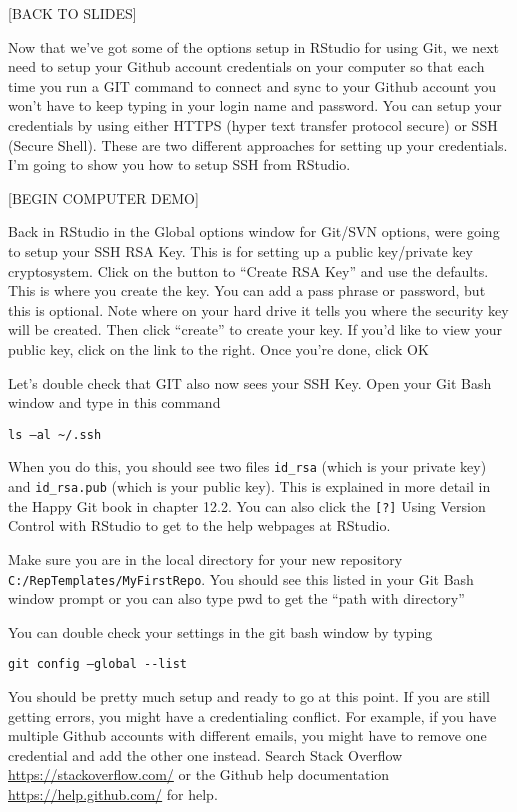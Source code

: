 \documentclass[]{book}
\theoremstyle{definition}
\theoremstyle{definition}
\theoremstyle{definition}
\theoremstyle{remark}
\begin{document}
{[}BACK TO SLIDES{]}

Now that we've got some of the options setup in RStudio for using Git,
we next need to setup your Github account credentials on your computer
so that each time you run a GIT command to connect and sync to your
Github account you won't have to keep typing in your login name and
password. You can setup your credentials by using either HTTPS (hyper
text transfer protocol secure) or SSH (Secure Shell). These are two
different approaches for setting up your credentials. I'm going to show
you how to setup SSH from RStudio.

{[}BEGIN COMPUTER DEMO{]}

Back in RStudio in the Global options window for Git/SVN options, were
going to setup your SSH RSA Key. This is for setting up a public
key/private key cryptosystem. Click on the button to ``Create RSA Key''
and use the defaults. This is where you create the key. You can add a
pass phrase or password, but this is optional. Note where on your hard
drive it tells you where the security key will be created. Then click
``create'' to create your key. If you'd like to view your public key,
click on the link to the right. Once you're done, click OK

Let's double check that GIT also now sees your SSH Key. Open your Git
Bash window and type in this command

\texttt{ls\ –al\ \textasciitilde{}/.ssh}

When you do this, you should see two files \texttt{id\_rsa} (which is
your private key) and \texttt{id\_rsa.pub} (which is your public key).
This is explained in more detail in the Happy Git book in chapter 12.2.
You can also click the \texttt{{[}?{]}} Using Version Control with
RStudio to get to the help webpages at RStudio.

Make sure you are in the local directory for your new repository
\texttt{C:/RepTemplates/MyFirstRepo}. You should see this listed in your
Git Bash window prompt or you can also type pwd to get the ``path with
directory''

You can double check your settings in the git bash window by typing

\texttt{git\ config\ –global\ -\/-list}

You should be pretty much setup and ready to go at this point. If you
are still getting errors, you might have a credentialing conflict. For
example, if you have multiple Github accounts with different emails, you
might have to remove one credential and add the other one instead.
Search Stack Overflow \url{https://stackoverflow.com/} or the Github
help documentation \url{https://help.github.com/} for help.
\end{document}
